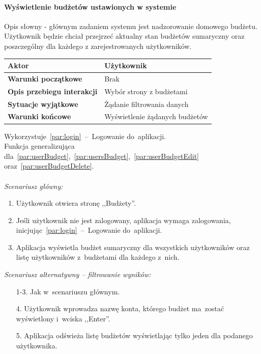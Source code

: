 \paragraph{Wyświetlenie budżetów ustawionych w systemie\newline}
\label{par:budgetsList}
Opis słowny - głównym zadaniem systemu jest nadzorowanie domowego budżetu. Użytkownik
będzie chciał przejrzeć aktualny stan budżetów sumaryczny oraz poszczególny dla każdego z 
zarejestrowanych użytkowników.
\begin{longtable}{|p{5cm}|p{7cm}|}
 	\hline
	\textbf{Aktor} & Użytkownik \\
	\hline
	\textbf{Warunki początkowe} & Brak
	\\
	\hline
	\textbf{Opis przebiegu interakcji} & Wybór strony z budżetami
	\\
	\hline
	\textbf{Sytuacje wyjątkowe} & Żądanie filtrowania danych
	\\
	\hline
	\textbf{Warunki końcowe} & Wyświetlenie żądanych budżetów
	\\
	\hline
 \end{longtable}
Wykorzystuje~\ref{par:login}~--~Logowanie do~aplikacji.\\
\indent Funkcja generalizująca dla~\ref{par:userBudget},~\ref{par:usersBudget},~\ref{par:userBudgetEdit} oraz~\ref{par:userBudgetDelete}.\\\\
\textit{Scenariusz główny:}
\begin{enumerate}
  \item Użytkownik otwiera stronę ,,Budżety''.
  \item Jeśli użytkownik nie jest zalogowany, aplikacja wymaga zalogowania, inicjując~\ref{par:login}~--~Logowanie do~aplikacji.
  \item Aplikacja wyświetla budżet sumaryczny dla wszystkich użytkowników oraz listę użytkowników z~budżetami dla każdego z~nich.
\end{enumerate}
\textit{Scenariusz alternatywny -- filtrowanie wyników:}
\begin{enumerate}
  \item[1-3.] Jak w~scenariuszu głównym.
  \item[4.] Użytkownik wprowadza nazwę konta, którego budżet ma~zostać wyświetlony i~wciska ,,Enter''.
  \item[5.] Aplikacja odświeża listę budżetów wyświetlając tylko jeden dla podanego użytkownika.
\end{enumerate}

